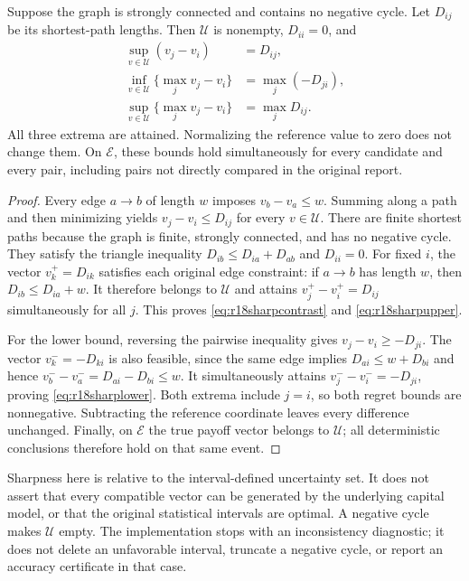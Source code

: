 \begin{proposition}\label{prop:r18closure}
Suppose the graph is strongly connected and contains no negative cycle.
Let $D_{ij}$ be its shortest-path lengths. Then $\mathcal U$ is nonempty,
$D_{ii}=0$, and
\begin{align}
 \sup_{v\in\mathcal U}(v_j-v_i)&=D_{ij},\label{eq:r18sharpcontrast}\\
 \inf_{v\in\mathcal U}\{\max_j v_j-v_i\}
     &=\max_j(-D_{ji}),\label{eq:r18sharplower}\\
 \sup_{v\in\mathcal U}\{\max_j v_j-v_i\}
     &=\max_j D_{ij}.\label{eq:r18sharpupper}
\end{align}
All three extrema are attained. Normalizing the reference value to zero
does not change them. On $\mathcal E$, these bounds hold simultaneously
for every candidate and every pair, including pairs not directly compared
in the original report.
\end{proposition}
\begin{proof}
Every edge $a\to b$ of length $w$ imposes $v_b-v_a\leq w$.
Summing along a path and then minimizing yields
$v_j-v_i\leq D_{ij}$ for every $v\in\mathcal U$.
There are finite shortest paths because the graph is finite, strongly
connected, and has no negative cycle. They satisfy the triangle inequality
$D_{ib}\leq D_{ia}+D_{ab}$ and $D_{ii}=0$.
For fixed $i$, the vector $v_k^+=D_{ik}$ satisfies each original edge
constraint: if $a\to b$ has length $w$, then
$D_{ib}\leq D_{ia}+w$. It therefore belongs to $\mathcal U$ and
attains $v_j^+-v_i^+=D_{ij}$ simultaneously for all $j$. This proves
\eqref{eq:r18sharpcontrast} and \eqref{eq:r18sharpupper}.

For the lower bound, reversing the pairwise inequality gives
$v_j-v_i\geq-D_{ji}$. The vector $v_k^-=-D_{ki}$ is also feasible,
since the same edge implies $D_{ai}\leq w+D_{bi}$ and hence
$v_b^--v_a^-=D_{ai}-D_{bi}\leq w$. It simultaneously attains
$v_j^--v_i^-=-D_{ji}$, proving \eqref{eq:r18sharplower}.
Both extrema include $j=i$, so both regret bounds are nonnegative.
Subtracting the reference coordinate leaves every difference unchanged.
Finally, on $\mathcal E$ the true payoff vector belongs to $\mathcal U$;
all deterministic conclusions therefore hold on that same event.
\end{proof}

Sharpness here is relative to the interval-defined uncertainty set. It does
not assert that every compatible vector can be generated by the underlying
capital model, or that the original statistical intervals are optimal.
A negative cycle makes $\mathcal U$ empty. The implementation stops with
an inconsistency diagnostic; it does not delete an unfavorable interval,
truncate a negative cycle, or report an accuracy certificate in that case.

